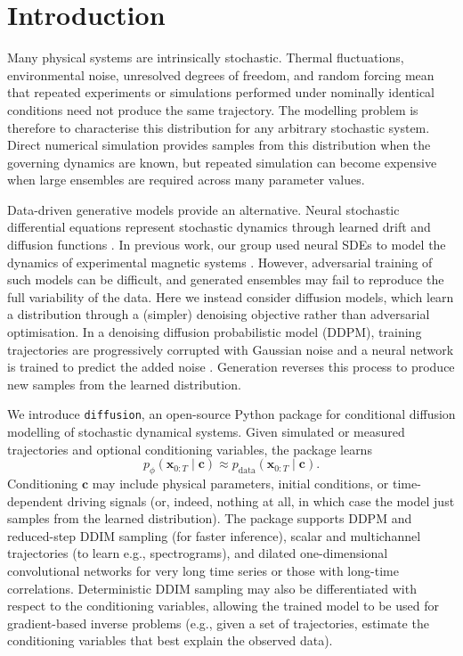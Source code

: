 \section{Introduction}
\label{sec:introduction}

Many physical systems are intrinsically stochastic. Thermal fluctuations, environmental noise, unresolved degrees of freedom, and random forcing mean that repeated experiments or simulations performed under nominally identical conditions need not produce the same trajectory. The modelling problem is therefore to characterise this distribution for any arbitrary stochastic system. Direct numerical simulation provides samples from this distribution when the governing dynamics are known, but repeated simulation can become expensive when large ensembles are required across many parameter values.

Data-driven generative models provide an alternative. Neural stochastic differential equations represent stochastic dynamics through learned drift and diffusion functions \cite{kidger2021neuralsde}. In previous work, our group used neural SDEs to model the dynamics of experimental magnetic systems \cite{manneschi2025}. However, adversarial training of such models can be difficult, and generated ensembles may fail to reproduce the full variability of the data. Here we instead consider diffusion models, which learn a distribution through a (simpler) denoising objective rather than adversarial optimisation. In a denoising diffusion probabilistic model (DDPM), training trajectories are progressively corrupted with Gaussian noise and a neural network is trained to predict the added noise \cite{sohldickstein2015,ho2020ddpm}. Generation reverses this process to produce new samples from the learned distribution.

We introduce \texttt{diffusion}, an open-source Python package for conditional diffusion modelling of stochastic dynamical systems. Given simulated or measured trajectories and optional conditioning variables, the package learns
\begin{equation}
    p_{\phi}(\mathbf{x}_{0:T}\mid\mathbf{c})
    \approx
    p_{\mathrm{data}}(\mathbf{x}_{0:T}\mid\mathbf{c}).
\end{equation}
Conditioning $\mathbf{c}$ may include physical parameters, initial conditions, or time-dependent driving signals (or, indeed, nothing at all, in which case the model just samples from the learned distribution). The package supports DDPM and reduced-step DDIM sampling \cite{song2021ddim} (for faster inference), scalar and multichannel trajectories (to learn e.g., spectrograms), and dilated one-dimensional convolutional networks for very long time series or those with long-time correlations. Deterministic DDIM sampling may also be differentiated with respect to the conditioning variables, allowing the trained model to be used for gradient-based inverse problems (e.g., given a set of trajectories, estimate the conditioning variables that best explain the observed data).

